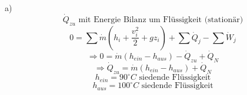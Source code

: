 a) \\
\[
\dot{Q}_{zu} \text{ mit Energie Bilanz um Flüssigkeit (stationär)}
\]
\[
0 = \sum \dot{m} \left( h_i + \frac{v_i^2}{2} + g z_i \right) + \sum \dot{Q}_j - \sum \dot{W}_j
\]
\[
\Rightarrow 0 = \dot{m} (h_{ein} - h_{aus}) - \dot{Q}_{zu} + \dot{Q}_N
\]
\[
\Rightarrow \dot{Q}_{zu} = \dot{m} (h_{ein} - h_{aus}) + \dot{Q}_N
\]
\[
h_{ein} = 90^\circ C \text{ siedende Flüssigkeit}
\]
\[
h_{aus} = 100^\circ C \text{ siedende Flüssigkeit}
\]